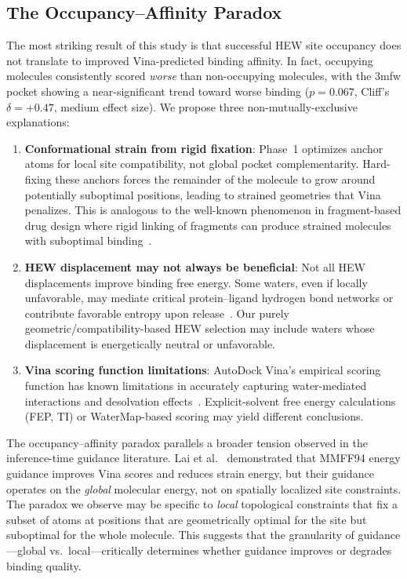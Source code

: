 \documentclass[11pt,letterpaper]{article}
\begin{document}
\subsection{The Occupancy--Affinity Paradox}

The most striking result of this study is that successful HEW site occupancy
does not translate to improved Vina-predicted binding affinity.  In fact,
occupying molecules consistently scored \emph{worse} than non-occupying
molecules, with the 3mfw pocket showing a near-significant trend toward worse
binding ($p = 0.067$, Cliff's $\delta = +0.47$, medium effect size).
We propose three non-mutually-exclusive explanations:

\begin{enumerate}[leftmargin=*]
  \item \textbf{Conformational strain from rigid fixation}: Phase~1 optimizes
    anchor atoms for local site compatibility, not global pocket
    complementarity.  Hard-fixing these anchors forces the remainder of the
    molecule to grow around potentially suboptimal positions, leading to
    strained geometries that Vina penalizes.  This is analogous to the
    well-known phenomenon in fragment-based drug design where rigid linking of
    fragments can produce strained molecules with suboptimal binding~\cite{michel2009}.

  \item \textbf{HEW displacement may not always be beneficial}: Not all HEW
    displacements improve binding free energy.  Some waters, even if locally
    unfavorable, may mediate critical protein--ligand hydrogen bond networks or
    contribute favorable entropy upon release~\cite{abel2008,spyrakis2017}.
    Our purely geometric/compatibility-based HEW selection may include waters
    whose displacement is energetically neutral or unfavorable.

  \item \textbf{Vina scoring function limitations}: AutoDock Vina's empirical
    scoring function has known limitations in accurately capturing
    water-mediated interactions and desolvation effects~\cite{trott2010}.
    Explicit-solvent free energy calculations (FEP, TI) or WaterMap-based
    scoring may yield different conclusions.
\end{enumerate}

The occupancy--affinity paradox parallels a broader tension observed in the
inference-time guidance literature.  Lai et al.~\cite{lai2025force} demonstrated
that MMFF94 energy guidance improves Vina scores and reduces strain energy,
but their guidance operates on the \emph{global} molecular energy, not on
spatially localized site constraints.  The paradox we observe may be specific to
\emph{local} topological constraints that fix a subset of atoms at positions
that are geometrically optimal for the site but suboptimal for the whole
molecule.  This suggests that the granularity of guidance---global vs.\
local---critically determines whether guidance improves or degrades binding
quality.
\end{document}

